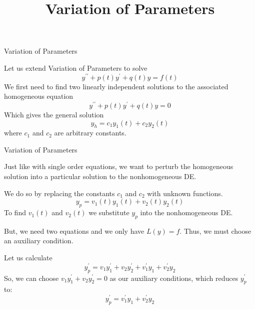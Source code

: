\documentclass{beamer}
\title[MATH 2250 - Section 4.5]{Variation of Parameters}
\begin{document}
\begin{frame}
  \titlepage
\end{frame}

\begin{frame}{Variation of Parameters}
\begin{block}{}
Let us extend Variation of Parameters to solve
\begin{equation*}
y^{\prime\prime}+p(t)y^{\prime}+q(t)y=f(t)
\end{equation*}\pause
We first need to find two linearly independent solutions to the associated homogeneous equation
\begin{equation*}
y^{\prime\prime}+p(t)y^{\prime}+q(t)y=0
\end{equation*}\pause
Which gives the general solution
\begin{equation*}
y_h=c_1 y_1(t) + c_2 y_2(t)
\end{equation*}
where $c_1$ and $c_2$ are arbitrary constants.
\end{block}
\end{frame}

\begin{frame}{Variation of Parameters}
\begin{block}{}
Just like with single order equations, we want to perturb the homogeneous solution into a particular solution to the nonhomogeneous DE.\pause

\vspace{2mm}
We do so by replacing the constants $c_1$ and $c_2$ with unknown functions. 
\begin{equation*}
y_p=v_1(t) y_1(t) + v_2(t) y_2(t)
\end{equation*}\pause
To find $v_1(t)$ and $v_2(t)$ we substitute $y_p$ into the nonhomogeneous DE\@.\pause

\vspace{2mm}
But, we need two equations and we only have $L(y)=f$. Thus, we must choose an auxiliary condition.\pause 

\vspace{2mm}
Let us calculate
\begin{equation*}
y_p^\prime=v_1 y_1^\prime + v_2 y_2^\prime + v_1^\prime y_1 + v_2^\prime y_2
\end{equation*}\pause
So, we can choose $v_1 y_1^\prime + v_2 y_2^\prime=0$ as our auxiliary conditions, which reduces $y_p^\prime$ to:
\begin{equation*}
y_p^\prime=v_1^\prime y_1 + v_2^\prime y_2
\end{equation*}
\end{block}
\end{frame}
\end{document}
